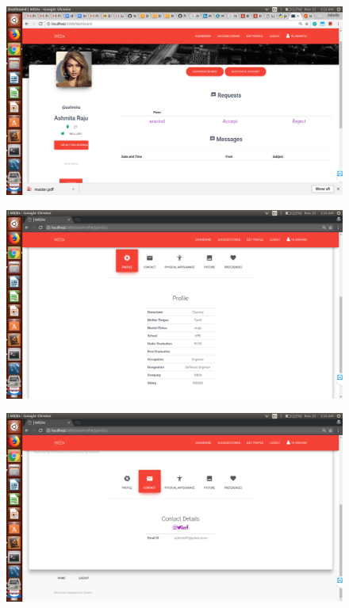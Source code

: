 \documentclass[12pt]{report}
\begin{document}
\begin{figure}[!htb]
    \centering
    \includegraphics[width=1\textwidth]{sc-11.png}
\end{figure}

\begin{figure}[!htb]
    \centering
    \includegraphics[width=1\textwidth]{sc-12.png}
\end{figure}

\begin{figure}[!htb]
    \centering
    \includegraphics[width=1\textwidth]{sc-13.png}
\end{figure}
\end{document}
